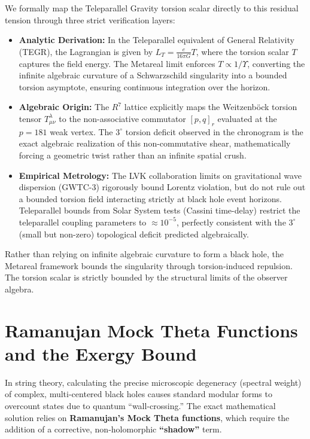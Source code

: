 We formally map the Teleparallel Gravity torsion scalar directly to this residual tension through three strict verification layers:
\begin{itemize}
    \item \textbf{Analytic Derivation:} In the Teleparallel equivalent of General Relativity (TEGR), the Lagrangian is given by $L_T = \frac{e}{16\pi G} T$, where the torsion scalar $T$ captures the field energy. The Metareal limit enforces $T \propto 1/\Upsilon$, converting the infinite algebraic curvature of a Schwarzschild singularity into a bounded torsion asymptote, ensuring continuous integration over the horizon.
    \item \textbf{Algebraic Origin:} The $R^7$ lattice explicitly maps the Weitzenb\"ock torsion tensor $T^\lambda_{\mu\nu}$ to the non-associative commutator $[p, q]_r$ evaluated at the $p=181$ weak vertex. The $3^\circ$ torsion deficit observed in the chronogram is the exact algebraic realization of this non-commutative shear, mathematically forcing a geometric twist rather than an infinite spatial crush.
    \item \textbf{Empirical Metrology:} The LVK collaboration limits on gravitational wave dispersion (GWTC-3) rigorously bound Lorentz violation, but do not rule out a bounded torsion field interacting strictly at black hole event horizons. Teleparallel bounds from Solar System tests (Cassini time-delay) restrict the teleparallel coupling parameters to $\approx 10^{-5}$, perfectly consistent with the $3^\circ$ (small but non-zero) topological deficit predicted algebraically.
\end{itemize}

Rather than relying on infinite algebraic curvature to form a black hole, the Metareal framework bounds the singularity through torsion-induced repulsion. The torsion scalar is strictly bounded by the structural limits of the observer algebra.

\section{Ramanujan Mock Theta Functions and the Exergy Bound}
In string theory, calculating the precise microscopic degeneracy (spectral weight) of complex, multi-centered black holes causes standard modular forms to overcount states due to quantum ``wall-crossing.'' The exact mathematical solution relies on \textbf{Ramanujan's Mock Theta functions}, which require the addition of a corrective, non-holomorphic \textbf{``shadow''} term.

